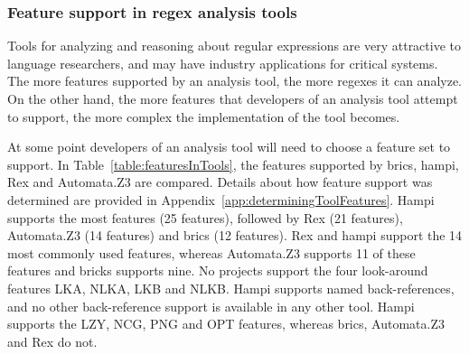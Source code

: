 

\subsubsection{Feature support in regex analysis tools}
\label{sec:featuresInTools}
Tools for analyzing and reasoning about regular expressions are very attractive to language researchers, and may have industry applications for critical systems.  The more features supported by an analysis tool, the more regexes it can analyze.  On the other hand, the more features that developers of an analysis tool attempt to support, the more complex the implementation of the tool becomes.

At some point developers of an analysis tool will need to choose a feature set to support.  In Table~\ref{table:featuresInTools}, the features supported by brics, hampi, Rex and Automata.Z3 are compared.  Details about how feature support was determined are provided in Appendix~\ref{app:determiningToolFeatures}.
Hampi supports the most features (25 features), followed by Rex (21 features), Automata.Z3 (14 features) and brics (12 features).  Rex and hampi support the 14 most commonly used features, whereas Automata.Z3 supports 11 of these features and bricks supports nine.  No projects support the four look-around features LKA, NLKA, LKB and NLKB.  Hampi supports named back-references, and no other back-reference support is available in any other tool.  Hampi supports the LZY, NCG, PNG and OPT features, whereas brics, Automata.Z3 and Rex do not.
